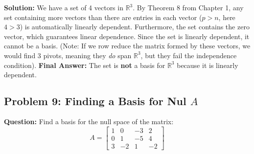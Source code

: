 \documentclass[12pt]{article}
\begin{document}
\textbf{Solution:}
We have a set of 4 vectors in $\mathbb{R}^3$. By Theorem 8 from Chapter 1, any set containing more vectors than there are entries in each vector ($p > n$, here $4 > 3$) is automatically linearly dependent. Furthermore, the set contains the zero vector, which guarantees linear dependence. 
Since the set is linearly dependent, it cannot be a basis. 
(Note: If we row reduce the matrix formed by these vectors, we would find 3 pivots, meaning they \textit{do} span $\mathbb{R}^3$, but they fail the independence condition).
\textbf{Final Answer:} The set is \textbf{not} a basis for $\mathbb{R}^3$ because it is linearly dependent.

\subsection{Problem 9: Finding a Basis for Nul $A$}
\textbf{Question:} Find a basis for the null space of the matrix:
\[ A = \begin{bmatrix} 1 & 0 & -3 & 2 \\ 0 & 1 & -5 & 4 \\ 3 & -2 & 1 & -2 \end{bmatrix} \]
\end{document}
